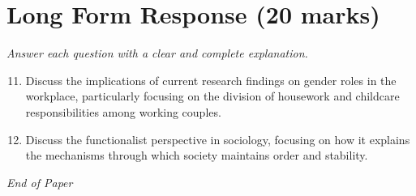 \documentclass[12pt]{article}
\begin{document}
\section*{Long Form Response (20 marks)}
\textit{Answer each question with a clear and complete explanation.}
\begin{enumerate}[label=\arabic*.]
\setcounter{enumi}{10}
\item Discuss the implications of current research findings on gender roles in the workplace, particularly focusing on the division of housework and childcare responsibilities among working couples.
\item Discuss the functionalist perspective in sociology, focusing on how it explains the mechanisms through which society maintains order and stability.
\end{enumerate}

\vfill
\noindent\textit{End of Paper}
\end{document}
